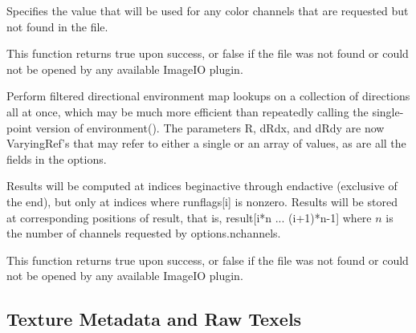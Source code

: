 \vspace{-24pt}
\vspace{10pt}
Specifies the value that will be used for any color channels that are
requested but not found in the file.
\apiend

This function returns {\cf true} upon success, or {\cf false} if the
file was not found or could not be opened by any available ImageIO
plugin.
\apiend


Perform filtered directional environment map lookups on a collection of
directions all at once, which may be much more efficient than repeatedly
calling the single-point version of {\cf environment()}.  The parameters
{\cf R}, {\cf dRdx}, and {\cf dRdy} are now {\cf VaryingRef}'s that may
refer to either a single or an array of values, as are all the fields in
the {\cf options}.

Results will be computed at indices {\cf beginactive} through
{\cf endactive} (exclusive of the end), but only at indices where {\cf runflags[i]}
is nonzero.  Results will be stored at corresponding positions of
{\cf result}, that is, {\cf result[i*n ... (i+1)*n-1]} where $n$ 
is the number of channels requested by {\cf options.nchannels}.

This function returns {\cf true} upon success, or {\cf false} if the
file was not found or could not be opened by any available ImageIO
plugin.
\apiend

\newpage
\subsection{Texture Metadata and Raw Texels}
\label{sec:texturesys:api:gettextureinfo}
\label{sec:texturesys:api:getimagespec}


